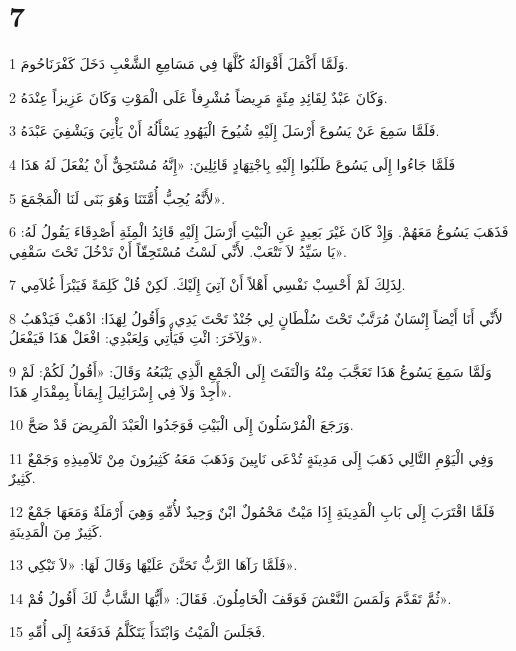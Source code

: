 \chapter{7}

\par 1 وَلَمَّا أَكْمَلَ أَقْوَالَهُ كُلَّهَا فِي مَسَامِعِ الشَّعْبِ دَخَلَ كَفْرَنَاحُومَ.
\par 2 وَكَانَ عَبْدٌ لِقَائِدِ مِئَةٍ مَرِيضاً مُشْرِفاً عَلَى الْمَوْتِ وَكَانَ عَزِيزاً عِنْدَهُ.
\par 3 فَلَمَّا سَمِعَ عَنْ يَسُوعَ أَرْسَلَ إِلَيْهِ شُيُوخَ الْيَهُودِ يَسْأَلُهُ أَنْ يَأْتِيَ وَيَشْفِيَ عَبْدَهُ.
\par 4 فَلَمَّا جَاءُوا إِلَى يَسُوعَ طَلَبُوا إِلَيْهِ بِاجْتِهَادٍ قَائِلِينَ: «إِنَّهُ مُسْتَحِقٌّ أَنْ يُفْعَلَ لَهُ هَذَا
\par 5 لأَنَّهُ يُحِبُّ أُمَّتَنَا وَهُوَ بَنَى لَنَا الْمَجْمَعَ».
\par 6 فَذَهَبَ يَسُوعُ مَعَهُمْ. وَإِذْ كَانَ غَيْرَ بَعِيدٍ عَنِ الْبَيْتِ أَرْسَلَ إِلَيْهِ قَائِدُ الْمِئَةِ أَصْدِقَاءَ يَقُولُ لَهُ: «يَا سَيِّدُ لاَ تَتْعَبْ. لأَنِّي لَسْتُ مُسْتَحِقّاً أَنْ تَدْخُلَ تَحْتَ سَقْفِي.
\par 7 لِذَلِكَ لَمْ أَحْسِبْ نَفْسِي أَهْلاً أَنْ آتِيَ إِلَيْكَ. لَكِنْ قُلْ كَلِمَةً فَيَبْرَأَ غُلاَمِي.
\par 8 لأَنِّي أَنَا أَيْضاً إِنْسَانٌ مُرَتَّبٌ تَحْتَ سُلْطَانٍ لِي جُنْدٌ تَحْتَ يَدِي. وَأَقُولُ لِهَذَا: اذْهَبْ فَيَذْهَبُ وَلِآخَرَ: ائْتِ فَيَأْتِي وَلِعَبْدِي: افْعَلْ هَذَا فَيَفْعَلُ».
\par 9 وَلَمَّا سَمِعَ يَسُوعُ هَذَا تَعَجَّبَ مِنْهُ وَالْتَفَتَ إِلَى الْجَمْعِ الَّذِي يَتْبَعُهُ وَقَالَ: «أَقُولُ لَكُمْ: لَمْ أَجِدْ وَلاَ فِي إِسْرَائِيلَ إِيمَاناً بِمِقْدَارِ هَذَا».
\par 10 وَرَجَعَ الْمُرْسَلُونَ إِلَى الْبَيْتِ فَوَجَدُوا الْعَبْدَ الْمَرِيضَ قَدْ صَحَّ.
\par 11 وَفِي الْيَوْمِ التَّالِي ذَهَبَ إِلَى مَدِينَةٍ تُدْعَى نَايِينَ وَذَهَبَ مَعَهُ كَثِيرُونَ مِنْ تَلاَمِيذِهِ وَجَمْعٌ كَثِيرٌ.
\par 12 فَلَمَّا اقْتَرَبَ إِلَى بَابِ الْمَدِينَةِ إِذَا مَيْتٌ مَحْمُولٌ ابْنٌ وَحِيدٌ لأُمِّهِ وَهِيَ أَرْمَلَةٌ وَمَعَهَا جَمْعٌ كَثِيرٌ مِنَ الْمَدِينَةِ.
\par 13 فَلَمَّا رَآهَا الرَّبُّ تَحَنَّنَ عَلَيْهَا وَقَالَ لَهَا: «لاَ تَبْكِي».
\par 14 ثُمَّ تَقَدَّمَ وَلَمَسَ النَّعْشَ فَوَقَفَ الْحَامِلُونَ. فَقَالَ: «أَيُّهَا الشَّابُّ لَكَ أَقُولُ قُمْ».
\par 15 فَجَلَسَ الْمَيْتُ وَابْتَدَأَ يَتَكَلَّمُ فَدَفَعَهُ إِلَى أُمِّهِ.
